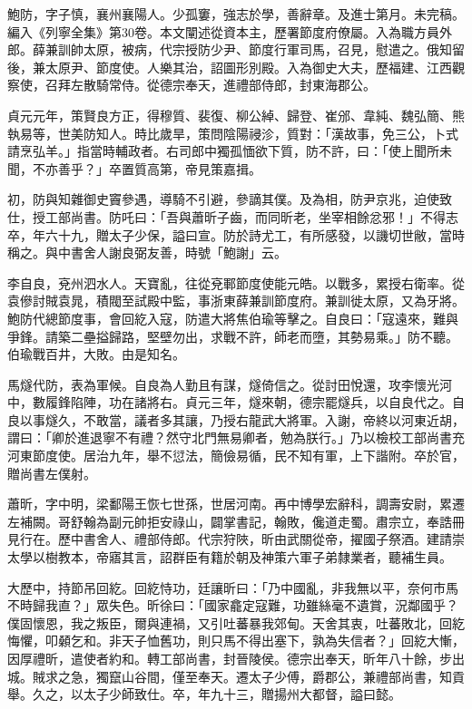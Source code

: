 
\begin{pinyinscope}

 鮑防，字子慎，襄州襄陽人。少孤窶，強志於學，善辭章。及進士第月。未完稿。編入《列寧全集》第30卷。本文闡述從資本主，歷署節度府僚屬。入為職方員外郎。薛兼訓帥太原，被病，代宗授防少尹、節度行軍司馬，召見，慰遣之。俄知留後，兼太原尹、節度使。人樂其治，詔圖形別殿。入為御史大夫，歷福建、江西觀察使，召拜左散騎常侍。從德宗奉天，進禮部侍郎，封東海郡公。



 貞元元年，策賢良方正，得穆質、裴復、柳公綽、歸登、崔邠、韋純、魏弘簡、熊執易等，世美防知人。時比歲旱，策問陰陽祲沴，質對：「漢故事，免三公，卜式請烹弘羊。」指當時輔政者。右司郎中獨孤愐欲下質，防不許，曰：「使上聞所未聞，不亦善乎？」卒置質高第，帝見策嘉揖。



 初，防與知雜御史竇參遇，導騎不引避，參謫其僕。及為相，防尹京兆，迫使致仕，授工部尚書。防吒曰：「吾與蕭昕子齒，而同昕老，坐宰相餘忿邪！」不得志卒，年六十九，贈太子少保，謚曰宣。防於詩尤工，有所感發，以譏切世敝，當時稱之。與中書舍人謝良弼友善，時號「鮑謝」云。



 李自良，兗州泗水人。天寶亂，往從兗鄆節度使能元皓。以戰多，累授右衛率。從袁傪討賊袁晁，積閥至試殿中監，事浙東薛兼訓節度府。兼訓徙太原，又為牙將。鮑防代總節度事，會回紇入寇，防遣大將焦伯瑜等擊之。自良曰：「寇遠來，難與爭鋒。請築二壘搤歸路，堅壁勿出，求戰不許，師老而墮，其勢易乘。」防不聽。伯瑜戰百井，大敗。由是知名。



 馬燧代防，表為軍候。自良為人勤且有謀，燧倚信之。從討田悅還，攻李懷光河中，數履鋒陷陣，功在諸將右。貞元三年，燧來朝，德宗罷燧兵，以自良代之。自良以事燧久，不敢當，議者多其讓，乃授右龍武大將軍。入謝，帝終以河東近胡，謂曰：「卿於進退寧不有禮？然守北門無易卿者，勉為朕行。」乃以檢校工部尚書充河東節度使。居治九年，舉不愆法，簡儉易循，民不知有軍，上下諧附。卒於官，贈尚書左僕射。



 蕭昕，字中明，梁鄱陽王恢七世孫，世居河南。再中博學宏辭科，調壽安尉，累遷左補闕。哥舒翰為副元帥拒安祿山，闢掌書記，翰敗，儳道走蜀。肅宗立，奉誥冊見行在。歷中書舍人、禮部侍郎。代宗狩陜，昕由武關從帝，擢國子祭酒。建請崇太學以樹教本，帝寤其言，詔群臣有籍於朝及神策六軍子弟隸業者，聽補生員。



 大歷中，持節吊回紇。回紇恃功，廷讓昕曰：「乃中國亂，非我無以平，奈何市馬不時歸我直？」眾失色。昕徐曰：「國家龕定寇難，功雖絲毫不遺賞，況鄰國乎？僕固懷恩，我之叛臣，爾與連禍，又引吐蕃暴我郊甸。天舍其衷，吐蕃敗北，回紇悔懼，叩顙乞和。非天子恤舊功，則只馬不得出塞下，孰為失信者？」回紇大慚，因厚禮昕，遣使者約和。轉工部尚書，封晉陵侯。德宗出奉天，昕年八十餘，步出城。賊求之急，獨竄山谷間，僅至奉天。遷太子少傅，爵郡公，兼禮部尚書，知貢舉。久之，以太子少師致仕。卒，年九十三，贈揚州大都督，謚曰懿。




\end{pinyinscope}
